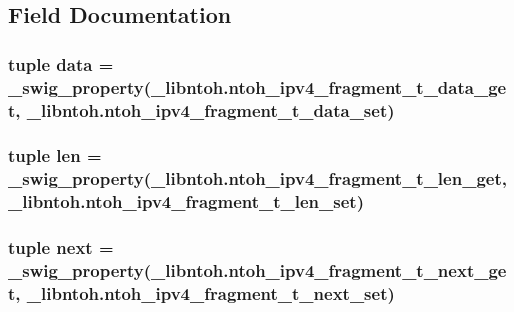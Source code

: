 \subsection{Field Documentation}
\hypertarget{classlibntoh_1_1ntoh__ipv4__fragment__t_aa7a0efb8690a34f61a95b00cc723ca27}{
\subsubsection[{data}]{\setlength{\rightskip}{0pt plus 5cm}tuple data = {\bf \-\_\-swig\-\_\-property}(\-\_\-libntoh.\-ntoh\-\_\-ipv4\-\_\-fragment\-\_\-t\-\_\-data\-\_\-get, \-\_\-libntoh.\-ntoh\-\_\-ipv4\-\_\-fragment\-\_\-t\-\_\-data\-\_\-set)\hspace{0.3cm}{\ttfamily [static]}}}\label{classlibntoh_1_1ntoh__ipv4__fragment__t_aa7a0efb8690a34f61a95b00cc723ca27}
\hypertarget{classlibntoh_1_1ntoh__ipv4__fragment__t_af8e41b97a0d8adea11037648944de58f}{
\subsubsection[{len}]{\setlength{\rightskip}{0pt plus 5cm}tuple len = {\bf \-\_\-swig\-\_\-property}(\-\_\-libntoh.\-ntoh\-\_\-ipv4\-\_\-fragment\-\_\-t\-\_\-len\-\_\-get, \-\_\-libntoh.\-ntoh\-\_\-ipv4\-\_\-fragment\-\_\-t\-\_\-len\-\_\-set)\hspace{0.3cm}{\ttfamily [static]}}}\label{classlibntoh_1_1ntoh__ipv4__fragment__t_af8e41b97a0d8adea11037648944de58f}
\hypertarget{classlibntoh_1_1ntoh__ipv4__fragment__t_a84e6dac37062f5a539ece8248c8567cc}{
\subsubsection[{next}]{\setlength{\rightskip}{0pt plus 5cm}tuple next = {\bf \-\_\-swig\-\_\-property}(\-\_\-libntoh.\-ntoh\-\_\-ipv4\-\_\-fragment\-\_\-t\-\_\-next\-\_\-get, \-\_\-libntoh.\-ntoh\-\_\-ipv4\-\_\-fragment\-\_\-t\-\_\-next\-\_\-set)\hspace{0.3cm}{\ttfamily [static]}}}\label{classlibntoh_1_1ntoh__ipv4__fragment__t_a84e6dac37062f5a539ece8248c8567cc}
